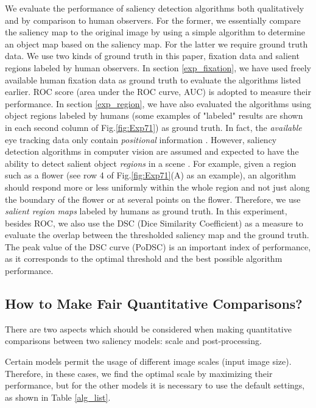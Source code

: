 \documentclass[10pt,journal,cspaper,compsoc]{IEEEtran}
\begin{document}
We evaluate the performance of saliency detection algorithms both qualitatively and by comparison to human observers. For the former, we essentially compare the saliency map to the original image by using a simple algorithm to determine an object map based on the saliency map. For the latter we require ground truth data. We use two kinds of ground truth in this paper, fixation data and salient regions labeled by human observers.
In section \ref{exp_fixation}, we have used freely available human fixation data \cite{NIPS2005_81} as ground truth to evaluate the algorithms listed earlier. ROC score (area under the ROC curve, AUC) is adopted to measure their performance.
In section \ref{exp_region}, we have also evaluated the algorithms using object regions labeled by humans (some examples of "labeled" results are shown in each second column of Fig.\ref{fig:Exp71}) as ground truth. In fact, the {\it available} eye tracking data only contain {\it positional} information \cite{hou2007saliency}. However, saliency detection algorithms in computer vision are assumed and expected to have the ability to detect salient object {\it regions} in a scene \cite{elazary2008salient}. For example, given a region such as a flower (see row 4 of Fig.\ref{fig:Exp71}(A) as an example), an algorithm should respond more or less uniformly within the whole region and not just along the boundary of the flower or at several points on the flower. Therefore, we use {\it salient region maps} labeled by humans as ground truth.
In this experiment, besides ROC, we also use the DSC (Dice Similarity Coefficient) as a measure to evaluate the overlap between the thresholded saliency map and the ground truth. The peak value of the DSC curve (PoDSC) is an important index of performance, as it corresponds to the optimal threshold and the best possible algorithm performance\cite{thomasevaluation2008}.

\subsection{How to Make Fair Quantitative Comparisons?}

There are two aspects which should be considered when making quantitative comparisons between two saliency models: scale and post-processing.

Certain models permit the usage of different image scales (input image size). Therefore, in these cases,  we find the optimal scale by maximizing their performance, but for the other models it is necessary to use the default settings, as shown in Table \ref{alg_list}.
\end{document}

